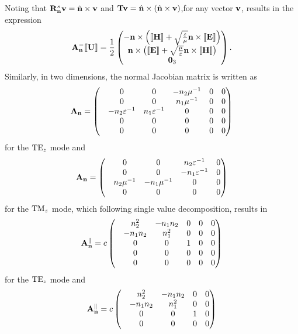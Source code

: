 Noting that $\mathbf{R}^{s}_{\mathbf{n}} \mathbf{v} = \hat{\mathbf{n}} \times \mathbf{v}$ and $\mathbf{T} \mathbf{v} = \hat{\mathbf{n}} \times \left(  \hat{\mathbf{n}}
  \times \mathbf{v} \right)$,for any vector $\mathbf{v}$, results in the expression
\begin{align}
\mathbf{A}_\mathbf{n}^{-} \llbracket \mathbf{U} \rrbracket = \frac{1}{2}
\begin{pmatrix}
  -\mathbf{n} \times \left( \llbracket \mathbf{H} \rrbracket + \sqrt{\frac{\varepsilon}{\mu}} \mathbf{n} \times \llbracket \mathbf{E} \rrbracket \right) \\
   \mathbf{n} \times \left( \llbracket \mathbf{E} \rrbracket + \sqrt{\frac{\mu}{\varepsilon}} \mathbf{n} \times \llbracket \mathbf{H} \rrbracket \right) \\
  \mathbf{0}_3
\end{pmatrix} .
  \label{eq:AnMinuU-expression-3D}
\end{align}
Similarly, in two dimensions, the normal Jacobian matrix is written as
$$
  \mathbf{A}_\mathbf{n} =
  \begin{pmatrix}
 & 0  & 0  & - n_2 \mu^{-1} & 0 & 0 \\
 & 0  & 0  & n_1 \mu^{-1} & 0 & 0 \\
 & - n_2 \varepsilon^{-1}  & n_1 \varepsilon^{-1}  & 0 & 0 & 0 \\
 & 0  & 0  & 0  & 0  & 0 \\
 & 0  & 0  & 0 & 0 & 0
 \end{pmatrix} 
$$
for the $\textrm{TE}_{z}$ mode and
$$
  \mathbf{A}_\mathbf{n} =
  \begin{pmatrix}
 & 0  & 0  & n_2 \varepsilon^{-1} & 0 \\
 & 0  & 0  & - n_1 \varepsilon^{-1} & 0 \\
 & n_2 \mu^{-1}  & - n_1 \mu^{-1}  & 0 & 0 \\
 & 0  & 0  & 0  & 0
 \end{pmatrix} 
$$
for the $\textrm{TM}_{z}$ mode, which following single value decomposition, results in
$$
  \mathbf{A}_\mathbf{n}^{\parallel} =
  c
  \begin{pmatrix}
 & n_2^2  &  - n_1 n_2 & 0 & 0 & 0 \\
 & - n_1 n_2 & n_1^2 & 0 & 0 & 0 \\
 & 0  & 0  & 1  & 0  & 0 \\
 & 0  & 0  & 0 & 0 & 0 \\
 & 0  & 0  & 0 & 0 & 0
 \end{pmatrix} 
$$
for the $\textrm{TE}_{z}$ mode and
$$
  \mathbf{A}_\mathbf{n}^{\parallel} =
  c
  \begin{pmatrix}
 & n_2^2  &  - n_1 n_2 & 0 & 0  \\
 & - n_1 n_2 & n_1^2 & 0 & 0  \\
 & 0  & 0  & 1  & 0   \\
 & 0  & 0  & 0 & 0  
  \end{pmatrix} 
$$

